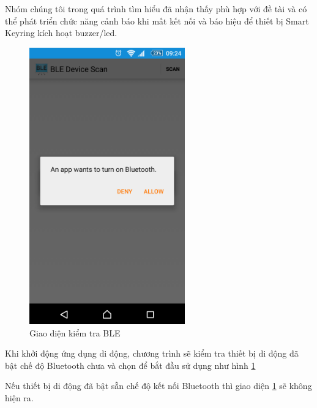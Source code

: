 Nhóm chúng tôi trong quá trình tìm hiểu đã nhận thấy phù hợp với đề tài và có thể phát triển chức năng cảnh báo khi mất kết nối và báo hiệu để thiết bị Smart Keyring kích hoạt buzzer/led.



	\begin{figure}[H]
		\centering    
		\includegraphics[width=0.6\textwidth]{androidoff}
		\caption[Giao diện kiểm tra BLE]{Giao diện kiểm tra BLE}
		\label{fig: androidoff}
	\end{figure}
Khi khởi động ứng dụng di động, chương trình sẽ kiểm tra thiết bị di động đã bật chế độ Bluetooth chưa và chọn để bắt đầu sử dụng như hình \ref{fig: androidoff}

Nếu thiết bị di động đã bật sẵn chế độ kết nối Bluetooth thì giao diện \ref{fig: androidoff} sẽ không hiện ra.

